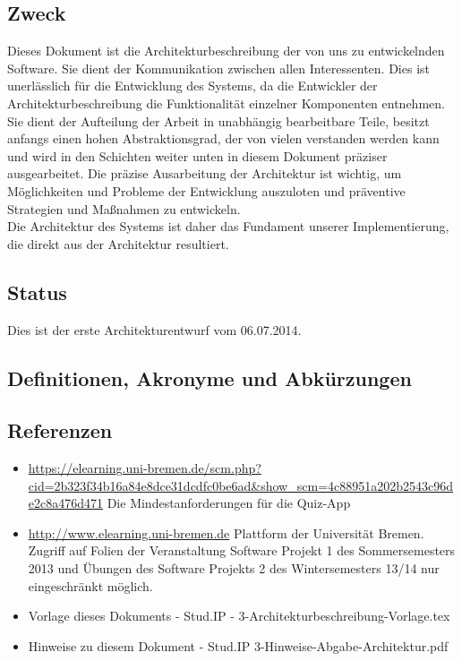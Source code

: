 \subsection{Zweck}
Dieses Dokument ist die Architekturbeschreibung der von uns zu entwickelnden Software.
Sie dient der Kommunikation zwischen allen Interessenten. Dies ist unerlässlich
für die Entwicklung des Systems, da die Entwickler der Architekturbeschreibung die
Funktionalität einzelner Komponenten entnehmen. Sie dient der Aufteilung der Arbeit
in unabhängig bearbeitbare Teile, besitzt anfangs einen hohen Abstraktionsgrad, der
von vielen verstanden werden kann und wird in den Schichten weiter unten in diesem
Dokument präziser ausgearbeitet. Die präzise Ausarbeitung der Architektur ist wichtig,
um Möglichkeiten und Probleme der Entwicklung auszuloten und präventive Strategien
und Maßnahmen zu entwickeln.\\
Die Architektur des Systems ist daher das Fundament unserer Implementierung, die
direkt aus der Architektur resultiert.


\subsection{Status}
Dies ist der erste Architekturentwurf vom 06.07.2014.

\subsection{Definitionen, Akronyme und Abkürzungen}

\subsection{Referenzen}

\begin{itemize}
\item{\url{https://elearning.uni-bremen.de/scm.php?cid=2b323f34b16a84e8dce31dcdfc0be6ad\&show\_scm=4c88951a202b2543c96de2c8a476d471}}
Die Mindestanforderungen für die Quiz-App 
\item \url{http://www.elearning.uni-bremen.de} Plattform der Universität Bremen. Zugriff auf Folien der Veranstaltung Software Projekt 1 des Sommersemesters 2013
und Übungen des Software Projekts 2 des Wintersemesters 13/14 nur eingeschränkt
möglich.
\item Vorlage dieses Dokuments - Stud.IP - 3-Architekturbeschreibung-Vorlage.tex
\item Hinweise zu diesem Dokument - Stud.IP 3-Hinweise-Abgabe-Architektur.pdf
\end{itemize}

